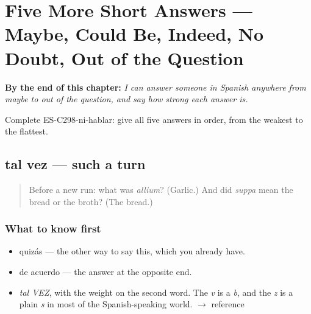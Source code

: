 
\chapter{Five More Short Answers --- Maybe, Could Be, Indeed, No Doubt, Out of the Question}
\label{ch:mas-respuestas}

\begin{chapteropening}
\textbf{By the end of this chapter:} \emph{I can answer someone in Spanish anywhere from maybe to out of the question, and say how strong each answer is.}

Complete ES-C298-ni-hablar: give all five answers in order, from the weakest to the flattest.
\end{chapteropening}

\section[tal vez]{tal vez — such a turn}

\label{lesson:ES-C298-tal-vez}



\begin{quote}
Before a new run: what was \emph{allium}? (Garlic.) And did \emph{suppa} mean the bread or the broth? (The bread.)
\end{quote}

\subsection*{What to know first}
\begin{itemize}
\raggedright
  \item quizás — the other way to say this, which you already have.
  \item de acuerdo — the answer at the opposite end.
\end{itemize}

\begin{sounds}
\begin{itemize}
\raggedright
  \item \emph{tal VEZ}, with the weight on the second word. The \emph{v} is a \emph{b}, and the \emph{z} is a plain \emph{s} in most of the Spanish-speaking world. $\to$ reference
\end{itemize}
\end{sounds}

